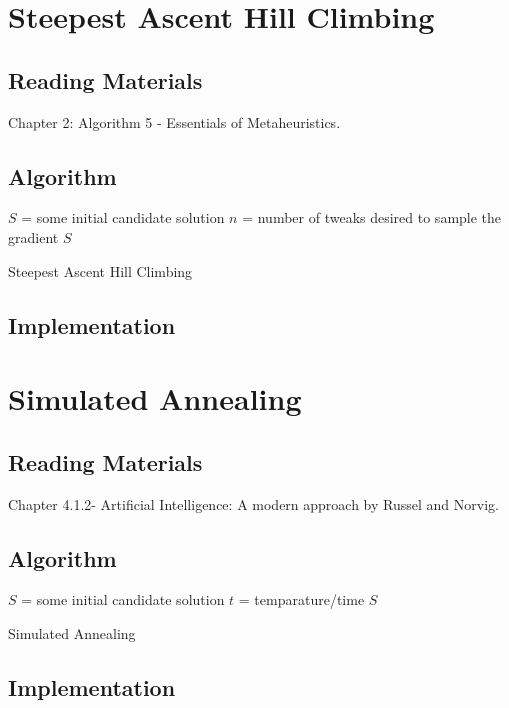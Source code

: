 \documentclass{article}
\begin{document}
 
  
  \section{Steepest Ascent Hill Climbing}
  
  \subsection{Reading Materials}
Chapter 2: Algorithm 5 - Essentials of Metaheuristics.
    
  \subsection{Algorithm}
  \begin{algorithm}
  $S$ = some initial candidate solution\;
  $n$ = number of tweaks desired to sample the gradient\;
  \Return $S$\;
  \caption{Steepest Ascent Hill Climbing}
  \label{algo:st}
  \end{algorithm}
  \subsection{Implementation}
  
 
 
\section{Simulated Annealing}
  
  \subsection{Reading Materials}
  Chapter 4.1.2- Artificial Intelligence: A modern approach by Russel and Norvig.
  \subsection{Algorithm}
  \begin{algorithm}[h]
  $S$ = some initial candidate solution\;
  $t$ = temparature/time\;
  \Return $S$\;
  \caption{Simulated Annealing}
  \label{algo:sim}
  \end{algorithm}
  \subsection{Implementation}


 
  
\end{document}
